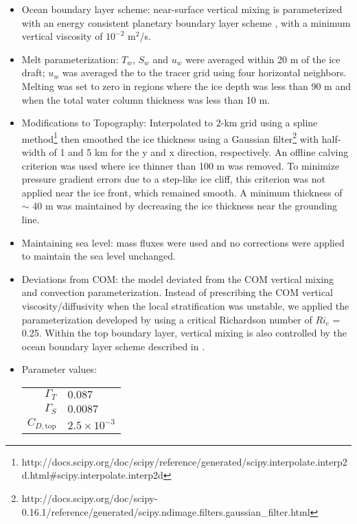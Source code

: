 \documentclass[11pt]{article} %
\begin{document}
\begin{itemize}
\item Ocean boundary layer scheme: near-surface vertical mixing is parameterized with an energy consistent planetary boundary layer scheme \citep{Reichl2018}, with a minimum vertical viscosity of $10^{-2}$ m$^2$/s.

\item Melt parameterization: $T_w$, $S_w$ and $u_w$ were averaged within 20 m of the ice draft; $u_w$ was averaged the to the tracer grid using four horizontal neighbors. Melting was set to zero in regions where the ice depth was less than 90 m and when the total water column thickness was less than 10 m.

\item Modifications to Topography: Interpolated to 2-km grid using a spline method\footnote{http://docs.scipy.org/doc/scipy/reference/generated/scipy.interpolate.interp2d.html\#scipy.interpolate.interp2d} then smoothed the ice thickness using a Gaussian filter\footnote{http://docs.scipy.org/doc/scipy-0.16.1/reference/generated/scipy.ndimage.filters.gaussian\_filter.html} with half-width of 1 and 5 km for the y and x direction, respectively. An offline calving criterion was used where ice thinner than 100 m was removed. To minimize pressure gradient errors due to a step-like ice cliff, this criterion was not applied near the ice front, which remained smooth. A minimum thickness of $\sim$ 40 m was maintained by decreasing the ice thickness near the grounding line.  

\item Maintaining sea level: mass fluxes were used and no corrections were applied to maintain the sea level unchanged.  

\item Deviations from COM: the model deviated from the COM vertical mixing and convection parameterization. Instead of prescribing the COM vertical viscosity/diffusivity when the local stratification was unstable, we applied the parameterization developed by \cite{Jackson2008} using a critical Richardson number of $Ri_c$ = 0.25. Within the top boundary layer, vertical mixing is also controlled by the ocean boundary layer scheme described in \cite{Reichl2018}.

\item Parameter values:

\begin{tabular}{rl}
$\Gamma_T$ & $0.087$ \\
$\Gamma_S$ & $0.0087$ \\
$C_{D,\textrm{top}}$ & $2.5 \times 10^{-3}$
\end{tabular}
\end{itemize}
\end{document}
